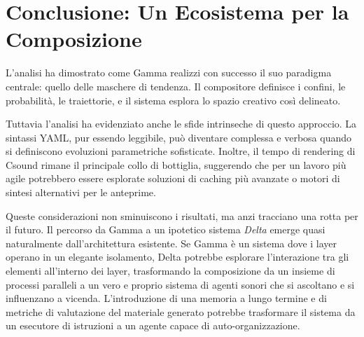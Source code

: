 
\section{Conclusione: Un Ecosistema per la Composizione}
L'analisi ha dimostrato come Gamma realizzi con successo il suo paradigma centrale: quello delle maschere di tendenza. Il compositore definisce i confini, le probabilità, le traiettorie, e il sistema esplora lo spazio creativo così delineato.

Tuttavia l'analisi ha evidenziato anche le sfide intrinseche di questo approccio. La sintassi YAML, pur essendo leggibile, può diventare complessa e verbosa quando si definiscono evoluzioni parametriche sofisticate. Inoltre, il tempo di rendering di Csound rimane il principale collo di bottiglia, suggerendo che per un lavoro più agile potrebbero essere esplorate soluzioni di caching più avanzate o motori di sintesi alternativi per le anteprime.

Queste considerazioni non sminuiscono i risultati, ma anzi tracciano una rotta per il futuro. Il percorso da Gamma a un ipotetico sistema \textit{Delta} emerge quasi naturalmente dall'architettura esistente. Se Gamma è un sistema dove i layer operano in un elegante isolamento, Delta potrebbe esplorare l'interazione tra gli elementi all'interno dei layer, trasformando la composizione da un insieme di processi paralleli a un vero e proprio sistema di agenti sonori che si ascoltano e si influenzano a vicenda. L'introduzione di una memoria a lungo termine e di metriche di valutazione del materiale generato potrebbe trasformare il sistema da un esecutore di istruzioni a un agente capace di auto-organizzazione.